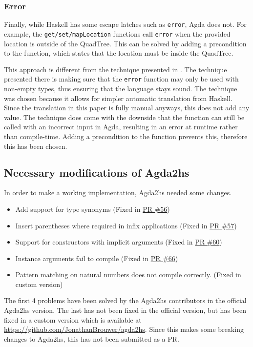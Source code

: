 \subsubsection{Error}
Finally, while Haskell has some escape latches such as \verb|error|, Agda does not. For example, the \verb|get/set/mapLocation| functions call \verb|error| when the provided location is outside of the QuadTree. This can be solved by adding a precondition to the function, which states that the location must be inside the QuadTree. 

This approach is different from the technique presented in \cite[p. 16]{BREITNER2021}. The technique presented there is making sure that the \verb|error| function may only be used with non-empty types, thus ensuring that the language stays sound. The technique was chosen because it allows for simpler automatic translation from Haskell. Since the translation in this paper is fully manual anyways, this does not add any value. The technique does come with the downside that the function can still be called with an incorrect input in Agda, resulting in an error at runtime rather than compile-time. Adding a precondition to the function prevents this, therefore this has been chosen.

\subsection{Necessary modifications of Agda2hs}
In order to make a working implementation, Agda2hs needed some changes.
\begin{itemize}
    \item Add support for type synonyms (Fixed in \textcolor{blue}{\href{https://github.com/agda/agda2hs/pull/56/}{PR \#56}})
    \item Insert parentheses where required in infix applications (Fixed in  \textcolor{blue}{\href{https://github.com/agda/agda2hs/pull/57/}{PR \#57}})
    \item Support for constructors with implicit arguments (Fixed in  \textcolor{blue}{\href{https://github.com/agda/agda2hs/pull/60/}{PR \#60}})
    \item Instance arguments fail to compile (Fixed in  \textcolor{blue}{\href{https://github.com/agda/agda2hs/pull/66/}{PR \#66}})
    \item Pattern matching on natural numbers does not compile correctly. (Fixed in custom version)
\end{itemize}
The first 4 problems have been solved by the Agda2hs contributors in the official Agda2hs version. The last has not been fixed in the official version, but has been fixed in a custom version which is available at \textcolor{blue}{\href{https://github.com/JonathanBrouwer/agda2hs}{https://github.com/JonathanBrouwer/agda2hs}}. Since this makes some breaking changes to Agda2hs, this has not been submitted as a PR.
